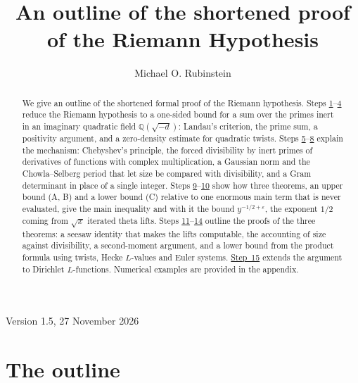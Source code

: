 \documentclass[11pt]{amsart}
\title[An outline of the shortened proof of RH]{An outline of the shortened proof of the Riemann Hypothesis}
\author{Michael O. Rubinstein}
\date{}
\numberwithin{equation}{section}
\theoremstyle{definition}
\theoremstyle{remark}
\begin{document}
\begin{abstract}
We give an outline of the shortened formal proof of the Riemann hypothesis.
Steps \hyperref[step:1]{1}--\hyperref[step:4]{4} reduce the Riemann hypothesis to a
one-sided bound for a sum over the primes inert in an imaginary quadratic field
$\mathbb{Q}(\sqrt{-d})$: Landau's criterion, the prime sum, a positivity argument,
and a zero-density estimate for quadratic twists. Steps
\hyperref[step:5]{5}--\hyperref[step:8]{8} explain the mechanism: Chebyshev's
principle, the forced divisibility by inert primes of derivatives of functions
with complex multiplication, a Gaussian norm and the Chowla--Selberg period
that let size be compared with divisibility, and a Gram determinant in place of
a single integer. Steps \hyperref[step:9]{9}--\hyperref[step:10]{10} show how
three theorems, an upper bound (A, B) and a lower bound (C) relative to one
enormous main term that is never evaluated, give the main inequality and with
it the bound $y^{-1/2+\varepsilon}$, the exponent $1/2$ coming from $\sqrt
x$ iterated theta lifts. Steps \hyperref[step:11]{11}--\hyperref[step:14]{14}
outline the proofs of the three theorems: a seesaw identity that makes the
lifts computable, the accounting of size against divisibility, a second-moment
argument, and a lower bound from the product formula using twists, Hecke
$L$-values and Euler systems. \hyperref[step:15]{Step~15} extends the argument
to Dirichlet $L$-functions. Numerical examples are provided in the appendix.
\end{abstract}

\maketitle

\begin{center}\small Version 1.5, 27 November 2026\end{center}

\setcounter{section}{-1}
\section{The outline}\label{sec:list}
\end{document}

